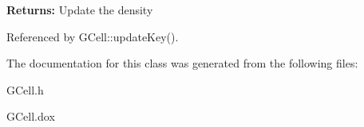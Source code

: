 {\bfseries Returns\-:} Update the density 

Referenced by G\-Cell\-::update\-Key().



The documentation for this class was generated from the following files\-:\begin{DoxyCompactItemize}
\item 
G\-Cell.\-h\item 
G\-Cell.\-dox\end{DoxyCompactItemize}
